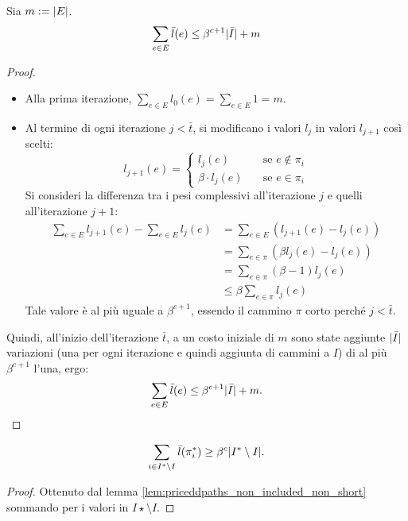 \begin{lemma}\label{lem:priceddpaths_sum_l_a_leq_bc_i_m}
	Sia $m:=| E |$.
	\begin{equation*}
		\sum_{e\in E}\bar l(e) \leq \beta^{c+1}| \bar I | + m
	\end{equation*}
\end{lemma}
\begin{proof}~
	\begin{itemize}
		\item Alla prima iterazione, $\sum_{e\in E} l_0(e) = \sum_{e\in E} 1 = m$.
		\item Al termine di ogni iterazione $j<\bar t$, si modificano i valori $l_j$ in valori $l_{j+1}$ così scelti:
		      \begin{equation*}
			      l_{j+1}(e) =
			      \begin{cases}
				      l_j(e)            & \quad\text{se } e\notin\pi_i \\
				      \beta\cdot l_j(e) & \quad\text{se } e\in\pi_i
			      \end{cases}
		      \end{equation*}
		      Si consideri la differenza tra i pesi complessivi all'iterazione $j$ e quelli all'iterazione $j+1$:
		      \begin{align*}
			      \sum_{e\in E} l_{j+1}(e) - \sum_{e\in E} l_j(e) & = \sum_{e\in E} (l_{j+1}(e)-l_j(e))   \\
			                                                      & = \sum_{e\in\pi}(\beta l_j(e)-l_j(e)) \\
			                                                      & = \sum_{e\in\pi} (\beta-1)l_j(e)      \\
			                                                      & \leq \beta\sum_{e\in\pi}l_j(e)
		      \end{align*}
		      Tale valore è al più uguale a $\beta^{c+1}$, essendo il cammino $\pi$ corto perché $j<\bar t$.
	\end{itemize}
	Quindi, all'inizio dell'iterazione $\bar t$, a un costo iniziale di $m$ sono state aggiunte $| \bar I |$ variazioni (una per ogni iterazione e quindi aggiunta di cammini a $I$) di al più $\beta^{c+1}$ l'una, ergo:
	\begin{equation*}
		\sum_{e\in E} \bar l(e) \leq \beta^{c+1}| \bar I |+m \text.
	\end{equation*}
\end{proof}

\begin{corollario}\label{cor:priceddpaths_cor_1}
	\begin{equation*}
		\sum_{i\in I^*\setminus I} \bar l(\pi_i^*) \geq \beta^c | I^*\setminus I | \text.
	\end{equation*}
\end{corollario}
\begin{proof}
	Ottenuto dal lemma \ref{lem:priceddpaths_non_included_non_short} sommando per i valori in $I\star\setminus I$.
\end{proof}

